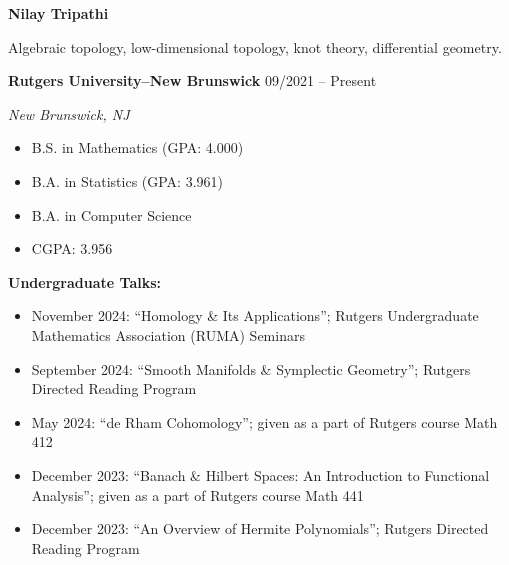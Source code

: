 \documentclass{article}
\begin{document}
		\begin{center}
				\LARGE \textbf{Nilay Tripathi}
		\end{center}
		
		\begin{multicols}{2}
				 \par 
				 \par 
				 \par 
		\end{multicols}		

		\vspace{1.0em}

		\noindent Algebraic topology, low-dimensional topology, knot theory, differential geometry.

		\vspace{1.0em}

		\noindent \textbf{Rutgers University--New Brunswick} \hfill 09/2021 -- Present \par 
		\noindent \textit{New Brunswick, NJ} 
		\begin{itemize}[noitemsep, nolistsep]
				\item B.S. in Mathematics (GPA: 4.000) 
				\item B.A. in Statistics (GPA: 3.961)
				\item B.A. in Computer Science 
				\item CGPA: 3.956
		\end{itemize}
		\vspace{1.0em}

		\noindent \textbf{Undergraduate Talks:}
		\begin{itemize}[noitemsep, nolistsep]
				\item November 2024: ``Homology \& Its Applications''; Rutgers Undergraduate Mathematics Association (RUMA) Seminars 
				\item September 2024: ``Smooth Manifolds \& Symplectic Geometry''; Rutgers Directed Reading Program 
				\item May 2024: ``de Rham Cohomology''; given as a part of Rutgers course Math 412 
				\item December 2023: ``Banach \& Hilbert Spaces: An Introduction to Functional Analysis''; given as a part of Rutgers course Math 441
				\item December 2023: ``An Overview of Hermite Polynomials''; Rutgers Directed Reading Program
		\end{itemize}
		\vspace{1.0em}
\end{document}
